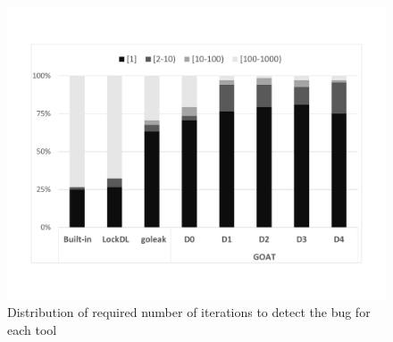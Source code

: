 \begin{figure}
\centering
  \includegraphics[width=.95\linewidth]{figs/P4_runs.pdf}
  \caption{Distribution of required number of iterations to detect the bug for each tool}
  \label{fig:runs}
\end{figure}
